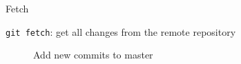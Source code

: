 \begin{frame}[allowframebreaks]{Fetch}
	
	\texttt{git fetch}: get all changes from the remote repository
	
	\begin{figure}
		\centering
	\end{figure}


	
	\begin{figure}
		\centering
		\caption{Add new commits to master}
	\end{figure}


\end{frame}
